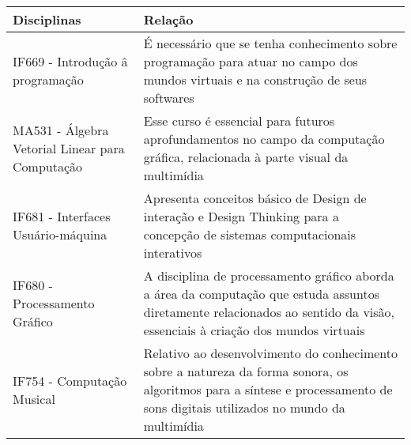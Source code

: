 \documentclass{article}
\begin{document}
\vspace{0.3cm}
\begin{tabular}{|p{3.0cm}|p{7.0cm}|}
\hline
Disciplinas & Relação\\
\hline
IF669 - Introdução â programação & É necessário que se tenha conhecimento sobre programação para atuar no campo dos mundos virtuais e na construção de seus softwares\\
\hline 
MA531 - Álgebra Vetorial Linear para Computação & Esse curso é essencial para futuros aprofundamentos no campo da computação gráfica, relacionada à parte visual da multimídia \\
\hline 
IF681 - Interfaces Usuário-máquina & Apresenta conceitos básico de Design de interação e Design Thinking para a concepção de sistemas computacionais interativos  \\
\hline 
IF680 - Processamento Gráfico & A disciplina de processamento gráfico aborda a área da computação que estuda assuntos diretamente relacionados ao sentido da visão, essenciais à criação dos mundos virtuais\\
\hline 
IF754 - Computação Musical & Relativo ao desenvolvimento do conhecimento sobre a natureza da forma sonora, os algoritmos para a síntese e processamento 
de sons digitais utilizados no mundo da multimídia\\
\hline

\end{tabular}



\nocite{*}
\end{document}
